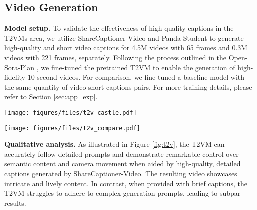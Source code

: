 \subsection{Video Generation}
\textbf{Model setup.}
To validate the effectiveness of high-quality captions in the T2VMs area, we utilize ShareCaptioner-Video and Panda-Student \cite{chen2024panda} to generate high-quality and short video captions for 4.5M videos with 65 frames and 0.3M videos with 221 frames, separately. Following the process outlined in the Open-Sora-Plan \cite{pku_yuan_lab_and_tuzhan_ai_etc_2024_10948109}, we fine-tuned the pretrained T2VM to enable the generation of high-fidelity 10-second videos. For comparison, we fine-tuned a baseline model with the same quantity of video-short-captions pairs. For more training details, please refer to Section \ref{sec:app_exp}.

\begin{figure*}[!t]
    \centering
    \texttt{[image: figures/files/t2v\_castle.pdf]}
    \vspace{-5pt}
    \caption{\textbf{Example of 10-second text-to-video task.} the T2VM trained on the detailed video-caption data can exhibit impressive camera control.}
    \label{fig:t2v}
    \vspace{-5pt}
\end{figure*}\begin{figure*}[!t]
    \centering
    \texttt{[image: figures/files/t2v\_compare.pdf]}
    \vspace{-15pt}
    \caption{\textbf{Influence of T2VM training caption length.} Thanks to the high-quality captions generated by ShareCaptioner-Video, the T2VM trained on the detailed video-caption data exhibits impressive semantic content control (video below), while the T2VM with short captions failed to follow the complex prompt (video above).}
    \label{fig:t2v_compare}
    \vspace{-5pt}
\end{figure*}\textbf{Qualitative analysis.}
As illustrated in Figure \ref{fig:t2v}, the T2VM can accurately follow detailed prompts and demonstrate remarkable control over semantic content and camera movement when aided by high-quality, detailed captions generated by ShareCaptioner-Video. The resulting video showcases intricate and lively content. In contrast, when provided with brief captions, the T2VM struggles to adhere to complex generation prompts, leading to subpar results.

